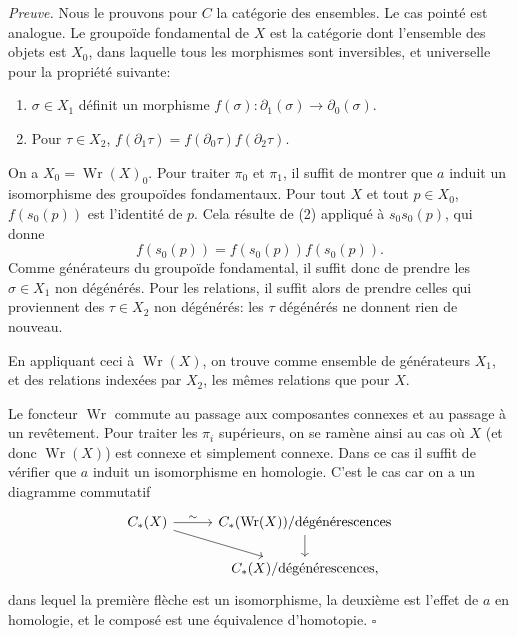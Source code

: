 \documentclass[11pt]{article}
\theoremstyle{deligne}
\newenvironment{proofdel}{\noindent\textit{Preuve.}}{\hfill$\square$}
\newcommand{\Wr}{\operatorname{Wr}}
\begin{document}
\begin{proofdel}
Nous le prouvons pour \(C\) la catégorie des ensembles. Le cas pointé est analogue. Le groupoïde fondamental de \(X\) est la catégorie dont l'ensemble des objets est \(X_0\), dans laquelle tous les morphismes sont inversibles, et universelle pour la propriété suivante:
\begin{enumerate}[label=(\arabic*)]
\item \(\sigma\in X_1\) définit un morphisme \(f(\sigma):\partial_1(\sigma)\to\partial_0(\sigma)\).
\item Pour \(\tau\in X_2\), \(f(\partial_1\tau)=f(\partial_0\tau)f(\partial_2\tau)\).
\end{enumerate}
On a \(X_0=\Wr(X)_0\). Pour traiter \(\pi_0\) et \(\pi_1\), il suffit de montrer que \(a\) induit un isomorphisme des groupoïdes fondamentaux. Pour tout \(X\) et tout \(p\in X_0\), \(f(s_0(p))\) est l'identité de \(p\). Cela résulte de (2) appliqué à \(s_0s_0(p)\), qui donne
\[
f(s_0(p))=f(s_0(p))f(s_0(p)).
\]
Comme générateurs du groupoïde fondamental, il suffit donc de prendre les \(\sigma\in X_1\) non dégénérés. Pour les relations, il suffit alors de prendre celles qui proviennent des \(\tau\in X_2\) non dégénérés: les \(\tau\) dégénérés ne donnent rien de nouveau.

En appliquant ceci à \(\Wr(X)\), on trouve comme ensemble de générateurs \(X_1\), et des relations indexées par \(X_2\), les mêmes relations que pour \(X\).

Le foncteur \(\Wr\) commute au passage aux composantes connexes et au passage à un revêtement. Pour traiter les \(\pi_i\) supérieurs, on se ramène ainsi au cas où \(X\) (et donc \(\Wr(X)\)) est connexe et simplement connexe. Dans ce cas il suffit de vérifier que \(a\) induit un isomorphisme en homologie. C'est le cas car on a un diagramme commutatif
\[
\begin{tikzcd}[column sep=2.8em,row sep=1.6em]
C_*(X) \arrow[r,"\sim"] \arrow[dr] & C_*(\Wr(X))/\text{dégénérescences} \arrow[d] \\
& C_*(X)/\text{dégénérescences},
\end{tikzcd}
\]
dans lequel la première flèche est un isomorphisme, la deuxième est l'effet de \(a\) en homologie, et le composé est une équivalence d'homotopie.
\end{proofdel}
\end{document}
